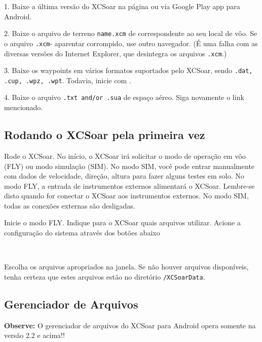 \documentclass[a4paper,12pt]{refrep}
\renewcommand{\config}[3]{\bmenut{Config}{#1/3}{\LARGE$\triangleright$}~\bmenut{#2}{#3}}%
\begin{document}
\begin{compactitem}
\item[1.] Baixe a última versão do XCSoar na página 
{\xcsoarwebsite{}} ou via Google Play app para Android.
\item[2.] Baixe o arquivo de terreno \texttt{name.xcm} de 
{}
correspondente ao seu local de vôo.  Se o arquivo \texttt{.xcm}- aparentar corrompido, use outro navegador. (É uma falha com as diversas versões do Internet Explorer, que desintegra os arquivos \texttt{.xcm}.)
\item[3.] Baixe os waypoints em vários formatos suportados pelo XCSoar, sendo \texttt{.dat, .cup, .wpz, .wpt}. Todavia, inicie com {}.
\item[4.] Baixe o arquivo \texttt{.txt and/or .sua} de espaço aéreo.  Siga novamente o link mencionado.
\end{compactitem}

\subsection{\textcolor{flashblue}{Rodando o XCSoar pela primeira vez}}
Rode o XCSoar.  No início, o XCSoar irá solicitar o modo de operação em vôo (FLY) ou modo simulação (SIM).  No modo SIM, você pode entrar manualmente com dados de velocidade, direção, altura para fazer alguns testes em solo.  No modo FLY, a entrada de instrumentos externos alimentará o XCSoar.  Lembre-se disto quando for conectar o XCSoar aos instrumentos externos.  No modo SIM, todas as conexões externas são desligadas.

Inicie o modo FLY.  Indique para o XCSoar quais arquivos utilizar.  Acione a configuração do sistema através dos botões abaixo

\begin{flushleft}\hspace*{1cm}\config{2}{Sistema}{}\blink{}
\blink{}\\\end{flushleft}

Escolha os arquivos apropriados na janela.  Se não houver arquivos disponíveis, tenha certeza que estes arquivos estão no diretório \texttt{/XCSoarData}.

\subsection{\textcolor{flashblue}{Gerenciador de Arquivos}}
\textbf{Observe:} O gerenciador de arquivos do XCSoar para Android opera somente na versão 2.2 e acima!!
\end{document}
